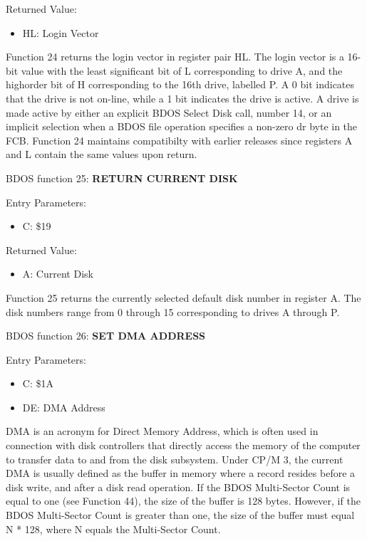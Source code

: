 Returned Value:
\begin{itemize}
\item[] HL: Login Vector
\end{itemize}

Function 24 returns the login vector in register pair HL. The login
vector is a 16-bit value with the least significant bit of L
corresponding to drive A, and the highorder bit of H corresponding to
the 16th drive, labelled P. A 0 bit indicates that the drive is not
on-line, while a 1 bit indicates the drive is active. A drive is made
active by either an explicit BDOS Select Disk call, number 14, or an
implicit selection when a BDOS file operation specifies a non-zero dr
byte in the FCB. Function 24 maintains compatibilty with earlier
releases since registers A and L contain the same values upon return.

BDOS function 25: \textbf{RETURN CURRENT DISK}

Entry Parameters:
\begin{itemize}
\item[] C: \$19
\end{itemize}

Returned Value:
\begin{itemize}
\item[] A: Current Disk
\end{itemize}

Function 25 returns the currently selected default disk number in
register A. The disk numbers range from 0 through 15 corresponding to
drives A through P.

BDOS function 26: \textbf{SET DMA ADDRESS}

Entry Parameters:
\begin{itemize}
\item[] C: \$1A
\item[] DE: DMA Address
\end{itemize}

DMA is an acronym for Direct Memory Address, which is often used in
connection with disk controllers that directly access the memory of
the computer to transfer data to and from the disk subsystem. Under
CP/M 3, the current DMA is usually defined as the buffer in memory
where a record resides before a disk write, and after a disk read
operation. If the BDOS Multi-Sector Count is equal to one (see
Function 44), the size of the buffer is 128 bytes. However, if the
BDOS Multi-Sector Count is greater than one, the size of the buffer
must equal N * 128, where N equals the Multi-Sector Count.

